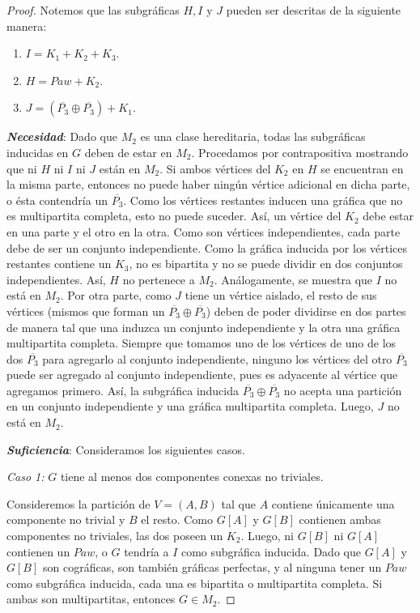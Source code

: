 \begin{proof}

    Notemos que las subgráficas $H, I$ y $J$ pueden ser descritas de la siguiente manera:

    \begin{enumerate}[(1)]
        \item $I = K_1 + K_2 + K_3$.
        \item $H = Paw + K_2$.
        \item $J = (\overline{P_3} \oplus \overline{P_3}) + K_1$.
    \end{enumerate}

    \textbf{\emph{Necesidad}}: Dado que $M_2$ es una clase hereditaria, todas las subgráficas inducidas en $G$ deben de estar en $M_2$. Procedamos por contrapositiva mostrando que ni $H$ ni $I$ ni $J$ están en $M_2$. Si ambos vértices del $K_2$ en $H$ se encuentran en la misma parte, entonces no puede haber ningún vértice adicional en dicha parte, o ésta contendría un $\overline{P_3}$. Como los vértices restantes inducen una gráfica que no es multipartita completa, esto no puede suceder. Así, un vértice del $K_2$ debe estar en una parte y el otro en la otra. Como son vértices independientes, cada parte debe de ser un conjunto independiente. Como la gráfica inducida por los vértices restantes contiene un $K_3$, no es bipartita y no se puede dividir en dos conjuntos independientes. Así, $H$ no pertenece a $M_2$. Análogamente, se muestra que $I$ no está en $M_2$. Por otra parte, como $J$ tiene un vértice aislado, el resto de sus vértices (mismos que forman un $\overline{P_3} \oplus \overline{P_3}$) deben de poder dividirse en dos partes de manera tal que una induzca un conjunto independiente y la otra una gráfica multipartita completa. Siempre que tomamos uno de los vértices de uno de los dos $\overline{P_3}$ para agregarlo al conjunto independiente, ninguno los vértices del otro $\overline{P_3}$ puede ser agregado al conjunto independiente, pues es adyacente al vértice que agregamos primero. Así, la subgráfica inducida $\overline{P_3} \oplus \overline{P_3}$ no acepta una partición en un conjunto independiente y una gráfica multipartita completa. Luego, $J$ no está en $M_2$.

    \textbf{\emph{Suficiencia}}: Consideramos los siguientes casos.

    \emph{Caso 1:} $G$ tiene al menos dos componentes conexas no triviales.

    Consideremos la partición de $V = (A,B)$ tal que $A$ contiene únicamente una componente no trivial y $B$ el resto. Como $G[A]$ y $G[B]$ contienen ambas componentes no triviales, las dos poseen un $K_2$. Luego, ni $G[B]$ ni $G[A]$ contienen un $Paw$, o $G$ tendría a $I$ como subgráfica inducida. Dado que $G[A]$ y $G[B]$ son cográficas, son también gráficas perfectas, y al ninguna tener un $Paw$ como subgráfica inducida, cada una es bipartita o multipartita completa. Si ambas son multipartitas, entonces $G \in M_2$.


\end{proof}
